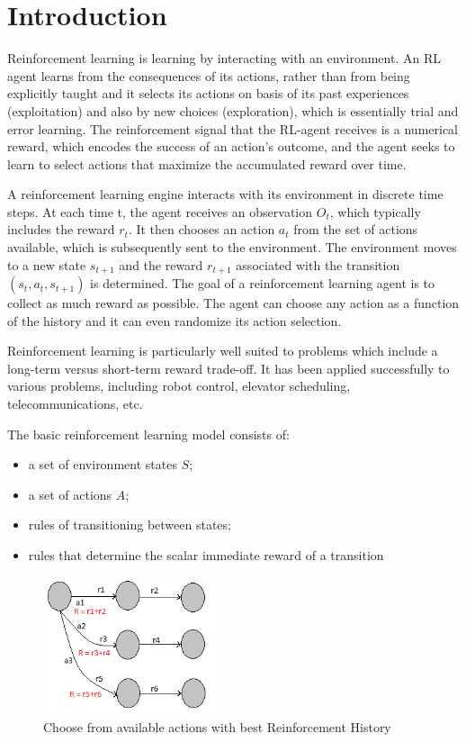 \documentclass{article}
\begin{document}
\section{Introduction}
Reinforcement learning is learning by interacting with an environment. An RL agent learns from the consequences of its actions, rather than from being explicitly taught and it selects its actions on basis of its past experiences (exploitation) and also by new choices (exploration), which is essentially trial and error learning. The reinforcement signal that the RL-agent receives is a numerical reward, which encodes the success of an action's outcome, and the agent seeks to learn to select actions that maximize the accumulated reward over time.\par
A reinforcement learning engine interacts with its environment in discrete time steps. At each time t, the agent receives an observation $O_t$, which typically includes the reward $r_t$. It then chooses an action $a_t$ from the set of actions available, which is subsequently sent to the environment. The environment moves to a new state $s_{t+1}$ and the reward $r_{t+1}$ associated with the transition $(s_t,a_t,s_{t+1})$ is determined. The goal of a reinforcement learning agent is to collect as much reward as possible. The agent can choose any action as a function of the history and it can even randomize its action selection.  \par
Reinforcement learning is particularly well suited to problems which include a long-term versus short-term reward trade-off. It has been applied successfully to various problems, including robot control, elevator scheduling, telecommunications, etc. \par
The basic reinforcement learning model consists of:
\begin{itemize}
    \item a set of environment states $S$;
    \item a set of actions $A$;
    \item rules of transitioning between states;
    \item rules that determine the scalar immediate reward of a transition
\end{itemize}

\begin{figure}[h]
  \centering
  \includegraphics[width=2in]{RL.png}
  \caption{Choose from available actions with best Reinforcement History}
  \label{fig:RL}
\end{figure}
\end{document}
